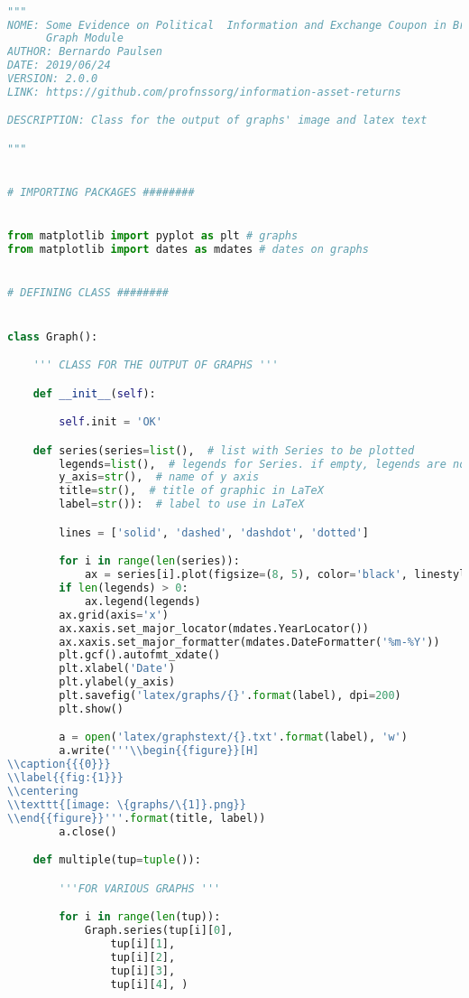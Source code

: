 \begin{lstlisting}[language=Python]

"""
NOME: Some Evidence on Political  Information and Exchange Coupon in Brazil  -
      Graph Module
AUTHOR: Bernardo Paulsen
DATE: 2019/06/24
VERSION: 2.0.0
LINK: https://github.com/profnssorg/information-asset-returns

DESCRIPTION: Class for the output of graphs' image and latex text

"""


# IMPORTING PACKAGES ########


from matplotlib import pyplot as plt # graphs
from matplotlib import dates as mdates # dates on graphs


# DEFINING CLASS ########


class Graph():

    ''' CLASS FOR THE OUTPUT OF GRAPHS '''

    def __init__(self):

        self.init = 'OK'

    def series(series=list(),  # list with Series to be plotted
        legends=list(),  # legends for Series. if empty, legends are not included
        y_axis=str(),  # name of y axis
        title=str(),  # title of graphic in LaTeX
        label=str()):  # label to use in LaTeX

        lines = ['solid', 'dashed', 'dashdot', 'dotted']

        for i in range(len(series)):
            ax = series[i].plot(figsize=(8, 5), color='black', linestyle=lines[i])
        if len(legends) > 0:
            ax.legend(legends)
        ax.grid(axis='x')
        ax.xaxis.set_major_locator(mdates.YearLocator())
        ax.xaxis.set_major_formatter(mdates.DateFormatter('%m-%Y'))
        plt.gcf().autofmt_xdate()
        plt.xlabel('Date')
        plt.ylabel(y_axis)
        plt.savefig('latex/graphs/{}'.format(label), dpi=200)
        plt.show()

        a = open('latex/graphstext/{}.txt'.format(label), 'w')
        a.write('''\\begin{{figure}}[H]
\\caption{{{0}}}
\\label{{fig:{1}}}
\\centering
\\texttt{[image: \{graphs/\{1]}.png}}
\\end{{figure}}'''.format(title, label))
        a.close()

    def multiple(tup=tuple()):

        '''FOR VARIOUS GRAPHS '''

        for i in range(len(tup)):
            Graph.series(tup[i][0],
                tup[i][1],
                tup[i][2],
                tup[i][3],
                tup[i][4], )
        
\end{lstlisting}